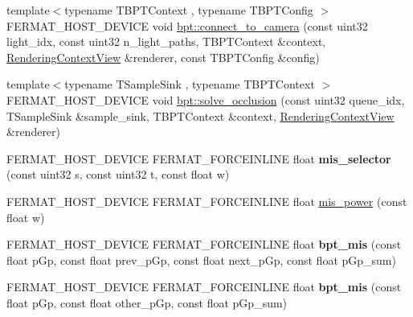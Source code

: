 \begin{DoxyCompactItemize}
\item 
{\footnotesize template$<$typename T\+B\+P\+T\+Context , typename T\+B\+P\+T\+Config $>$ }\\F\+E\+R\+M\+A\+T\+\_\+\+H\+O\+S\+T\+\_\+\+D\+E\+V\+I\+CE void \hyperlink{group___b_p_t_lib_core_gaf85f457b11ee79f45371b8afe928cabe}{bpt\+::connect\+\_\+to\+\_\+camera} (const uint32 light\+\_\+idx, const uint32 n\+\_\+light\+\_\+paths, T\+B\+P\+T\+Context \&context, \hyperlink{struct_rendering_context_view}{Rendering\+Context\+View} \&renderer, const T\+B\+P\+T\+Config \&config)
\item 
{\footnotesize template$<$typename T\+Sample\+Sink , typename T\+B\+P\+T\+Context $>$ }\\F\+E\+R\+M\+A\+T\+\_\+\+H\+O\+S\+T\+\_\+\+D\+E\+V\+I\+CE void \hyperlink{group___b_p_t_lib_core_ga588188b86e2afbe1f62d1bdd7a145cbf}{bpt\+::solve\+\_\+occlusion} (const uint32 queue\+\_\+idx, T\+Sample\+Sink \&sample\+\_\+sink, T\+B\+P\+T\+Context \&context, \hyperlink{struct_rendering_context_view}{Rendering\+Context\+View} \&renderer)
\item 
\mbox{\label{group___b_p_t_lib_core_gaefc1e6e64ff1fdc09195b98facf023fe}} 
F\+E\+R\+M\+A\+T\+\_\+\+H\+O\+S\+T\+\_\+\+D\+E\+V\+I\+CE F\+E\+R\+M\+A\+T\+\_\+\+F\+O\+R\+C\+E\+I\+N\+L\+I\+NE float {\bfseries mis\+\_\+selector} (const uint32 s, const uint32 t, const float w)
\item 
F\+E\+R\+M\+A\+T\+\_\+\+H\+O\+S\+T\+\_\+\+D\+E\+V\+I\+CE F\+E\+R\+M\+A\+T\+\_\+\+F\+O\+R\+C\+E\+I\+N\+L\+I\+NE float \hyperlink{group___b_p_t_lib_core_gaab2d16546a42205b009be794594ead61}{mis\+\_\+power} (const float w)
\item 
\mbox{\label{group___b_p_t_lib_core_ga6473afa8910469fdec791e033d19facb}} 
F\+E\+R\+M\+A\+T\+\_\+\+H\+O\+S\+T\+\_\+\+D\+E\+V\+I\+CE F\+E\+R\+M\+A\+T\+\_\+\+F\+O\+R\+C\+E\+I\+N\+L\+I\+NE float {\bfseries bpt\+\_\+mis} (const float p\+Gp, const float prev\+\_\+p\+Gp, const float next\+\_\+p\+Gp, const float p\+Gp\+\_\+sum)
\item 
\mbox{\label{group___b_p_t_lib_core_gaf967121c1d37c948098d2845ca434a6d}} 
F\+E\+R\+M\+A\+T\+\_\+\+H\+O\+S\+T\+\_\+\+D\+E\+V\+I\+CE F\+E\+R\+M\+A\+T\+\_\+\+F\+O\+R\+C\+E\+I\+N\+L\+I\+NE float {\bfseries bpt\+\_\+mis} (const float p\+Gp, const float other\+\_\+p\+Gp, const float p\+Gp\+\_\+sum)
\item 

\end{DoxyCompactItemize}
